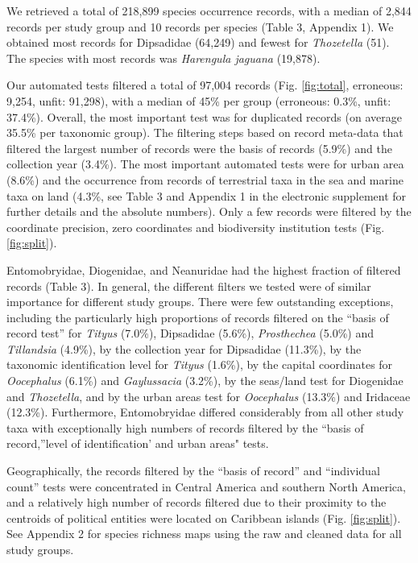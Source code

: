 \documentclass[fleqn,10pt,lineno]{wlpeerj} %
\begin{document}
We retrieved a total of 218,899 species occurrence records, with a median of 2,844 records per study group and 10 records per species (Table 3, Appendix 1). We obtained most records for Dipsadidae (64,249) and fewest for \emph{Thozetella} (51). The species with most records was \emph{Harengula jaguana} (19,878).

Our automated tests filtered a total of 97,004 records (Fig. \ref{fig:total}, erroneous: 9,254, unfit: 91,298), with a median of 45\% per group (erroneous: 0.3\%, unfit: 37.4\%). Overall, the most important test was for duplicated records (on average 35.5\% per taxonomic group). The filtering steps based on record meta-data that filtered the largest number of records were the basis of records (5.9\%) and the collection year (3.4\%). The most important automated tests were for urban area (8.6\%) and the occurrence from records of terrestrial taxa in the sea and marine taxa on land (4.3\%, see Table 3 and Appendix 1 in the electronic supplement for further details and the absolute numbers). Only a few records were filtered by the coordinate precision, zero coordinates and biodiversity institution tests (Fig. \ref{fig:split}).

Entomobryidae, Diogenidae, and Neanuridae had the highest fraction of filtered records (Table 3). In general, the different filters we tested were of similar importance for different study groups. There were few outstanding exceptions, including the particularly high proportions of records filtered on the ``basis of record test'' for \emph{Tityus} (7.0\%), Dipsadidae (5.6\%), \emph{Prosthechea} (5.0\%) and \emph{Tillandsia} (4.9\%), by the collection year for Dipsadidae (11.3\%), by the taxonomic identification level for \emph{Tityus} (1.6\%), by the capital coordinates for \emph{Oocephalus} (6.1\%) and \emph{Gaylussacia} (3.2\%), by the seas/land test for Diogenidae and \emph{Thozetella}, and by the urban areas test for \emph{Oocephalus} (13.3\%) and Iridaceae (12.3\%). Furthermore, Entomobryidae differed considerably from all other study taxa with exceptionally high numbers of records filtered by the ``basis of record,''level of identification' and urban areas" tests.

Geographically, the records filtered by the ``basis of record'' and ``individual count'' tests were concentrated in Central America and southern North America, and a relatively high number of records filtered due to their proximity to the centroids of political entities were located on Caribbean islands (Fig. \ref{fig:split}). See Appendix 2 for species richness maps using the raw and cleaned data for all study groups.
\end{document}
